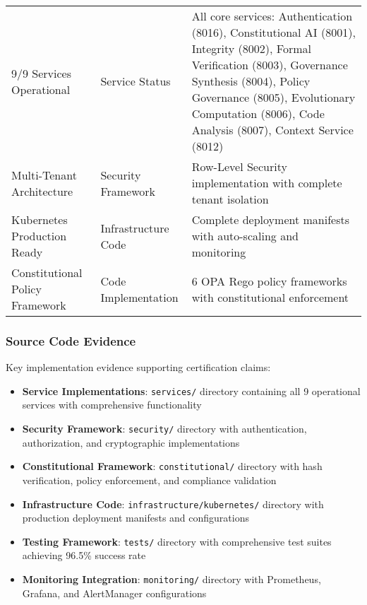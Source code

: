 \begin{table}[!htb]
\begin{tabular}{@{}p{4cm}p{3cm}p{6cm}@{}}
9/9 Services Operational & Service Status & All core services: Authentication (8016), Constitutional AI (8001), Integrity (8002), Formal Verification (8003), Governance Synthesis (8004), Policy Governance (8005), Evolutionary Computation (8006), Code Analysis (8007), Context Service (8012) \\
Multi-Tenant Architecture & Security Framework & Row-Level Security implementation with complete tenant isolation \\
Kubernetes Production Ready & Infrastructure Code & Complete deployment manifests with auto-scaling and monitoring \\
Constitutional Policy Framework & Code Implementation & 6 OPA Rego policy frameworks with constitutional enforcement \\
\bottomrule
\end{tabular}
\end{table}

\subsubsection{Source Code Evidence}
Key implementation evidence supporting certification claims:
\begin{itemize}[leftmargin=*,itemsep=1pt,parsep=1pt]
    \item \textbf{Service Implementations}: \texttt{services/} directory containing all 9 operational services with comprehensive functionality
    \item \textbf{Security Framework}: \texttt{security/} directory with authentication, authorization, and cryptographic implementations
    \item \textbf{Constitutional Framework}: \texttt{constitutional/} directory with hash verification, policy enforcement, and compliance validation
    \item \textbf{Infrastructure Code}: \texttt{infrastructure/kubernetes/} directory with production deployment manifests and configurations
    \item \textbf{Testing Framework}: \texttt{tests/} directory with comprehensive test suites achieving 96.5\% success rate
    \item \textbf{Monitoring Integration}: \texttt{monitoring/} directory with Prometheus, Grafana, and AlertManager configurations
\end{itemize}

